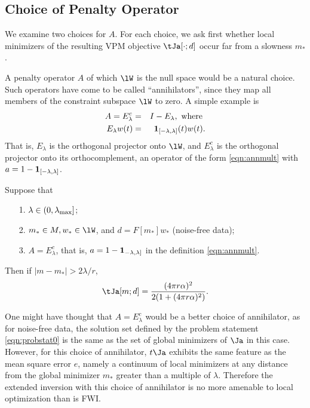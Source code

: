 \subsection{Choice of Penalty Operator}

We examine two choices for $A$. For each choice, we ask first whether local minimizers 
of the resulting VPM objective $\tJa[\cdot;d]$ occur far from a slowness $m_*$. 

A penalty operator $A$ of which $\lW$ is the null space would be a
natural choice. Such operators have come to be called
``annihilators'', since they map all members of the constraint
subspace $\lW$ to zero.  A simple example is
\begin{eqnarray}
  A = E^c_{\lambda}&=&I - E_{\lambda},\mbox{ where } \nonumber \\
  E_{\lambda}w(t) &=&{\bf 1}_{[-\lambda,\lambda]}(t)w(t). 
                      \label{eqn:ann0}
\end{eqnarray}
That is, $E_{\lambda}$ is the orthogonal projector onto $\lW$,
and $E_{\lambda}^c$ is the orthogonal projector onto its
orthocomplement, an operator of the form \ref{eqn:annmult} with $a
= 1 - {\bf 1}_{[-\lambda,\lambda]}$. %

\begin{theorem}
  \label{thm:boxcarbad}
  Suppose that
  \begin{itemize}
  \item[1. ] $\lambda \in (0,\lambda_{\rm max}]$;
  \item[2. ] $m_*\in M, w_*\in \lW$, and $d=F[m_*]w_*$ (noise-free
    data);
  \item[3. ] $A=E^c_{\lambda}$, that is, $a=1-{\bf 1}_{-\lambda,\lambda]}$ in
    the definition \ref{eqn:annmult}.
  \end{itemize}
  Then if $|m-m_*| >  2\lambda/r$,
  \[
    \tJa[m;d] = \frac{(4\pi r \alpha)^2}{2(1+(4 \pi r \alpha)^2)}.
  \]
\end{theorem}

One might have thought that $A=E^c_{\lambda}$ would be a better choice
of annihilator, as for noise-free
data, the solution set defined by the problem statement
\ref{eqn:probstat0} is the same as the set of global minimizers of
$\Ja$ in this case. However, for this choice of annihilator,
$t\Ja$ exhibits the same feature as the mean square error $e$, namely
a continuum of local minimizers at any distance from the global
minimizer $m_*$ greater than a multiple of $\lambda$. Therefore the
extended inversion with this choice of annihilator is no more amenable
to local optimization than is FWI.

